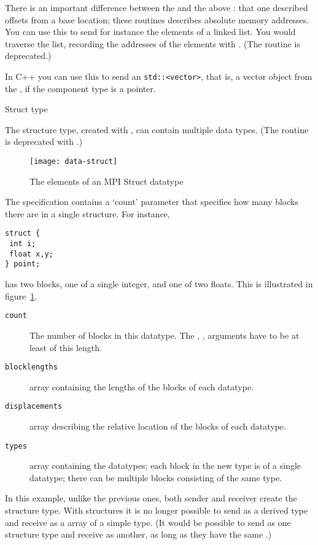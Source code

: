 There is an important difference between the  and the
above : that one described offsets from
a base location; these routines describes absolute memory addresses.
You can use this to send for instance the elements of a linked list.
You would traverse the list, recording the addresses of the
elements with .
(The routine  is deprecated.)

In C++ you can use this to
send an \lstinline{std::<vector>}, that
is, a vector object from the , if
the component type is a pointer.

 {Struct type}
\label{sec:data:struct}

The structure type, created with ,
can contain multiple data types. (The routine
 is deprecated with .)
%
\begin{figure}[t]
  \texttt{[image: data-struct]}
  \caption{The elements of an MPI Struct datatype}
  \label{fig:data-struct}
\end{figure}
%
The specification contains a `count' parameter that specifies how many blocks
there are in a single structure. For instance,
\begin{lstlisting}
struct {
 int i;
 float x,y;
} point;
\end{lstlisting}
has two blocks, one of a single integer, and one of two floats.
This is illustrated in figure~\ref{fig:data-struct}.

\begin{description}
\item[\texttt{count}] The number of blocks in this
  datatype. The , , 
  arguments have to be at least of this length.
\item[\texttt{blocklengths}] array containing the lengths of the blocks of each datatype.
\item[\texttt{displacements}] array describing the relative location
  of the blocks of each datatype.
\item[\texttt{types}] array containing the datatypes; each block in
  the new type is of a single datatype; there can be multiple
  blocks consisting of the same type.
\end{description}
In this example, unlike the previous ones, both sender and receiver
create the structure type. With structures it is no longer possible to
send as a derived type and receive as a array of a simple type.
(It would be possible to send as one structure type and receive as another, 
as long as they have the same .)

